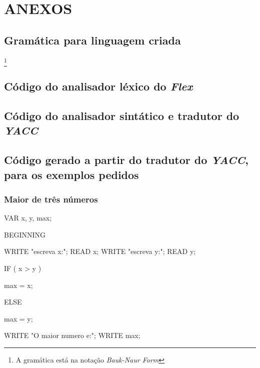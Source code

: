 \appendix

\part*{ANEXOS}

\chapter{Gramática para linguagem criada}\footnote{A gramática está na notação
	\emph{Bauk-Naur Form}}
\label{appendix:a}

\chapter{Código do analisador léxico do \emph{Flex}}
\label{appendix:b}

\chapter{Código do analisador sintático e tradutor do \emph{YACC}}
\label{appendix:c}

\chapter{Código gerado a partir do tradutor do \emph{YACC}, para os exemplos
pedidos}
\label{appendix:d}
\section{Maior de três números}
\label{appendix:d:sec:d1}
VAR x, y, max;


BEGINNING

	WRITE "escreva x:";
	READ x;
	WRITE "escreva y:";
	READ y;
	
	IF ( x > y )
	{
	  max = x;
	
	}
	ELSE
	{
	  max = y;
	
	}
	
	WRITE "O maior numero e:";
	WRITE max;
	
